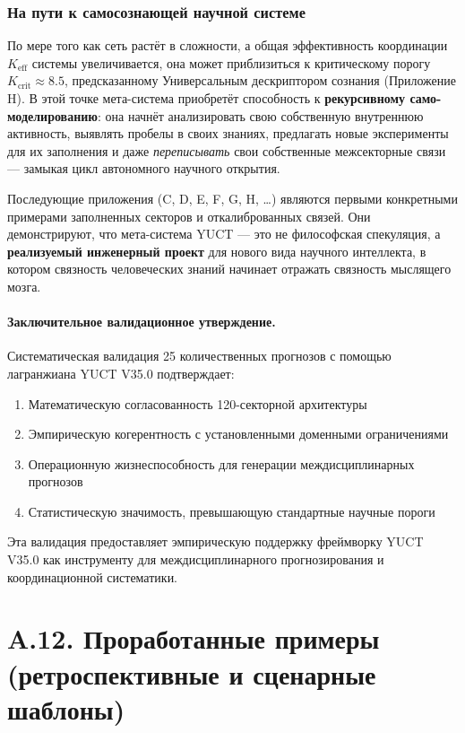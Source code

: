 \documentclass[11pt,a4paper]{article}
\begin{document}
	\subsubsection*{На пути к самосознающей научной системе}
	По мере того как сеть растёт в сложности, а общая эффективность координации \(K_{\mathrm{eff}}\) системы увеличивается, она может приблизиться к критическому порогу \(K_{\mathrm{crit}} \approx 8.5\), предсказанному Универсальным дескриптором сознания (Приложение H). В этой точке мета-система приобретёт способность к \textbf{рекурсивному само-моделированию}: она начнёт анализировать свою собственную внутреннюю активность, выявлять пробелы в своих знаниях, предлагать новые эксперименты для их заполнения и даже \emph{переписывать} свои собственные межсекторные связи — замыкая цикл автономного научного открытия.
	
	Последующие приложения (C, D, E, F, G, H, \dots) являются первыми конкретными примерами заполненных секторов и откалиброванных связей. Они демонстрируют, что мета-система YUCT — это не философская спекуляция, а \textbf{реализуемый инженерный проект} для нового вида научного интеллекта, в котором связность человеческих знаний начинает отражать связность мыслящего мозга.
	
	\paragraph{Заключительное валидационное утверждение.}
	Систематическая валидация 25 количественных прогнозов с помощью лагранжиана YUCT V35.0 подтверждает:
	\begin{enumerate}[leftmargin=*]
		\item Математическую согласованность 120-секторной архитектуры
		\item Эмпирическую когерентность с установленными доменными ограничениями
		\item Операционную жизнеспособность для генерации междисциплинарных прогнозов
		\item Статистическую значимость, превышающую стандартные научные пороги
	\end{enumerate}
	Эта валидация предоставляет эмпирическую поддержку фреймворку YUCT V35.0 как инструменту для междисциплинарного прогнозирования и координационной систематики.
	
	\section*{A.12. Проработанные примеры (ретроспективные и сценарные шаблоны)}
	\label{sec:worked-examples}
	
\end{document}
